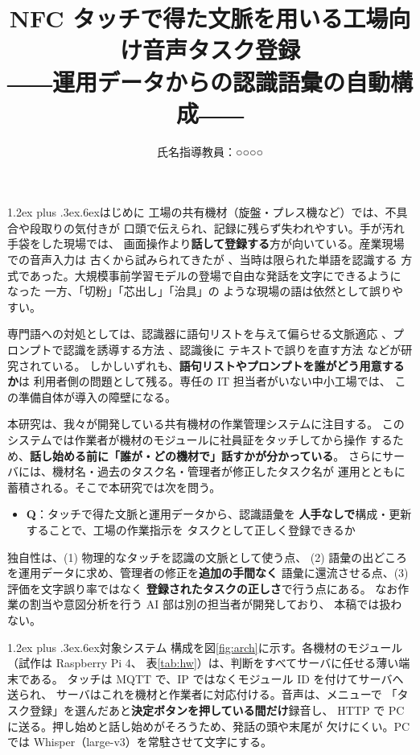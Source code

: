 \documentclass[a4paper,10pt,twocolumn]{ltjsarticle}
\title{\vspace{-12mm}\large\bfseries\sffamily
NFC タッチで得た文脈を用いる工場向け音声タスク登録\\[2pt]
\normalsize ――運用データからの認識語彙の自動構成――}
\author{\normalsize 氏名\hspace{2em}指導教員：○○○○}
\date{\vspace{-6mm}}
\makeatletter
\renewcommand{\section}{\@startsection{section}{1}{\z@}%
  {1.2ex plus .3ex}{.6ex}{\normalfont\normalsize\bfseries\sffamily}}
\makeatother
\begin{document}
\maketitle
\thispagestyle{plain}

\section{はじめに}
工場の共有機材（旋盤・プレス機など）では、不具合や段取りの気付きが
口頭で伝えられ、記録に残らず失われやすい。手が汚れ手袋をした現場では、
画面操作より\textbf{話して登録する}方が向いている。産業現場での音声入力は
古くから試みられてきたが \cite{ebukuro}、当時は限られた単語を認識する
方式であった。大規模事前学習モデルの登場で自由な発話を文字にできるように
なった \cite{kawahara2018,kawahara2023} 一方、「切粉」「芯出し」「治具」の
ような現場の語は依然として誤りやすい。

専門語への対処としては、認識器に語句リストを与えて偏らせる文脈適応
\cite{shudo}、プロンプトで認識を誘導する方法 \cite{sato}、認識後に
テキストで誤りを直す方法 \cite{ishikawa} などが研究されている。
しかしいずれも、\textbf{語句リストやプロンプトを誰がどう用意するか}は
利用者側の問題として残る。専任の IT 担当者がいない中小工場では、
この準備自体が導入の障壁になる。

本研究は、我々が開発している共有機材の作業管理システムに注目する。
このシステムでは作業者が機材のモジュールに社員証をタッチしてから操作
するため、\textbf{話し始める前に「誰が・どの機材で」話すかが分かっている}。
さらにサーバには、機材名・過去のタスク名・管理者が修正したタスク名が
運用とともに蓄積される。そこで本研究では次を問う。
\begin{itemize}
\item \textbf{Q}：タッチで得た文脈と運用データから、認識語彙を
  \textbf{人手なしで}構成・更新することで、工場の作業指示を
  タスクとして正しく登録できるか
\end{itemize}
独自性は、(1) 物理的なタッチを認識の文脈として使う点、
(2) 語彙の出どころを運用データに求め、管理者の修正を\textbf{追加の手間なく}
語彙に還流させる点、(3) 評価を文字誤り率ではなく
\textbf{登録されたタスクの正しさ}で行う点にある。
なお作業の割当や意図分析を行う AI 部は別の担当者が開発しており、
本稿では扱わない。

\section{対象システム}
構成を図\ref{fig:arch}に示す。各機材のモジュール（試作は Raspberry Pi 4、
表\ref{tab:hw}）は、判断をすべてサーバに任せる薄い端末である。
タッチは MQTT で、IP ではなくモジュール ID を付けてサーバへ送られ、
サーバはこれを機材と作業者に対応付ける。音声は、メニューで
「タスク登録」を選んだあと\textbf{決定ボタンを押している間だけ}録音し、
HTTP で PC に送る。押し始めと話し始めがそろうため、発話の頭や末尾が
欠けにくい。PC では Whisper（large-v3）を常駐させて文字にする。
\end{document}
